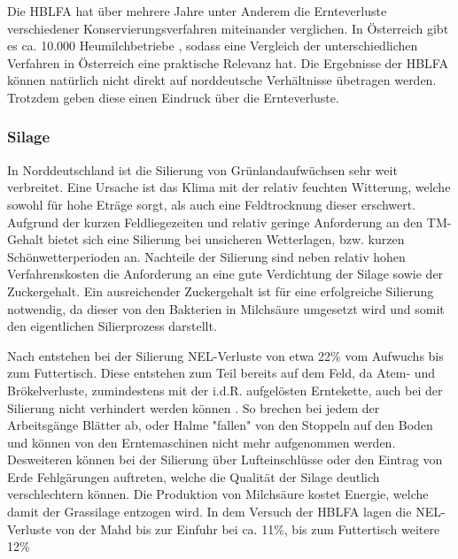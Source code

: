 Die \ac{HBLFA} hat über mehrere Jahre unter Anderem die Ernteverluste verschiedener Konservierungsverfahren miteinander verglichen.
In Österreich gibt es ca. 10.000 Heumilchbetriebe \parencite[75]{fritz2018ansatz}, sodass eine Vergleich der unterschiedlichen Verfahren in Österreich eine praktische Relevanz hat.
Die Ergebnisse der \ac{HBLFA} können natürlich nicht direkt auf norddeutsche Verhältnisse übetragen werden.
Trotzdem geben diese einen Eindruck über die Ernteverluste. 


\subsubsection{Silage}
\label{subsub:Silage}
In Norddeutschland ist die Silierung von Grünlandaufwüchsen sehr weit verbreitet.
Eine Ursache ist das Klima mit der relativ feuchten Witterung, welche sowohl für hohe Eträge sorgt, als auch eine Feldtrocknung dieser erschwert.
Aufgrund der kurzen Feldliegezeiten und relativ geringe Anforderung an den \ac{TM}-Gehalt bietet sich eine Silierung bei unsicheren Wetterlagen, bzw. kurzen Schönwetterperioden an.
Nachteile der Silierung sind neben relativ hohen Verfahrenskosten die Anforderung an eine gute Verdichtung der Silage sowie der Zuckergehalt.
Ein ausreichender Zuckergehalt ist für eine erfolgreiche Silierung notwendig, da dieser von den Bakterien in Milchsäure umgesetzt wird und somit den eigentlichen Silierprozess darstellt.

Nach \textcite[30]{fritz2018wirtschaftliche} entstehen bei der Silierung \ac{NEL}-Verluste von etwa 22\% vom Aufwuchs bis zum Futtertisch.
Diese entstehen zum Teil bereits auf dem Feld, da Atem- und Brökelverluste, zumindestens mit der i.d.R. aufgelösten Erntekette, auch bei der Silierung nicht verhindert werden können \parencite[58f]{gruber2015einfluss}.
So brechen bei jedem der Arbeitsgänge Blätter ab, oder Halme "fallen" von den Stoppeln auf den Boden und können von den Erntemaschinen nicht mehr aufgenommen werden.
Desweiteren können bei der Silierung über Lufteinschlüsse oder den Eintrag von Erde Fehlgärungen auftreten, welche die Qualität der Silage deutlich verschlechtern können.
Die Produktion von Milchsäure kostet Energie, welche damit der Grassilage entzogen wird\parencite[61]{gruber2015einfluss}.
In dem Versuch der \ac{HBLFA} lagen die \ac{NEL}-Verluste von der Mahd bis zur Einfuhr bei ca. 11\%, bis zum Futtertisch weitere 12\% \parencite[30]{fritz2018wirtschaftliche}



